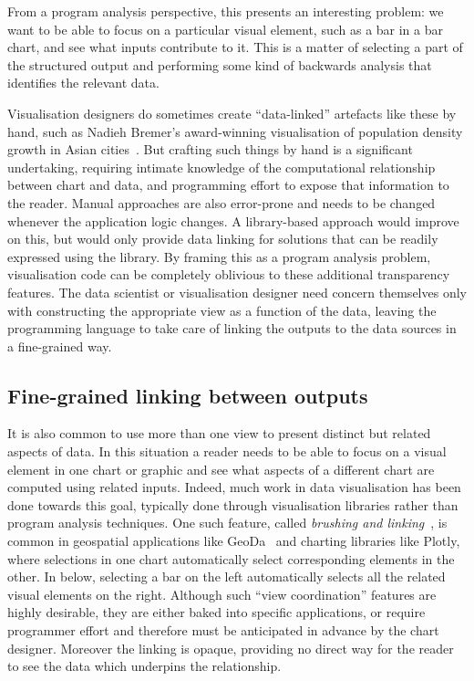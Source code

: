 \noindent From a program analysis perspective, this presents an interesting problem: we want to be able to focus on a particular visual element, such as a bar in a bar chart, and see what inputs contribute to it. This is a matter of selecting a part of the structured output and performing some kind of backwards analysis that identifies the relevant data.

Visualisation designers do sometimes create ``data-linked'' artefacts like these by hand, such as Nadieh Bremer's award-winning visualisation of population density growth in Asian cities~\cite{bremer15}. But crafting such things by hand is a significant undertaking, requiring intimate knowledge of the computational relationship between chart and data, and programming effort to expose that information to the reader. Manual approaches are also error-prone and needs to be changed whenever the application logic changes. A library-based approach would improve on this, but would only provide data linking for solutions that can be readily expressed using the library. By framing this as a program analysis problem, visualisation code can be completely oblivious to these additional transparency features. The data scientist or visualisation designer need concern themselves only with constructing the appropriate view as a function of the data, leaving the programming language to take care of linking the outputs to the data sources in a fine-grained way.

\subsection{Fine-grained linking between outputs}

It is also common to use more than one view to present distinct but related aspects of data. In this situation a reader needs to be able to focus on a visual element in one chart or graphic and see what aspects of a different chart are computed using related inputs. Indeed, much work in data visualisation has been done towards this goal, typically done through visualisation libraries rather than program analysis techniques. One such feature, called \emph{brushing and linking}~\cite{becker87}, is common in geospatial applications like GeoDa~\cite{anselin06} and charting libraries like Plotly, where selections in one chart automatically select corresponding elements in the other. In  below, selecting a bar on the left automatically selects all the related visual elements on the right. Although such ``view coordination'' features are highly desirable, they are either baked into specific applications, or require programmer effort and therefore must be anticipated in advance by the chart designer. Moreover the linking is opaque, providing no direct way for the reader to see the data which underpins the relationship.

